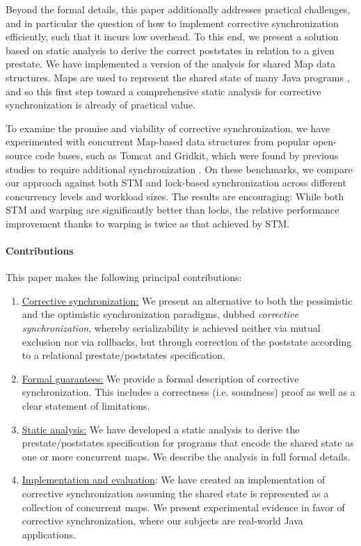 Beyond the formal details, this paper additionally addresses practical challenges, and in particular the question of how to implement corrective synchronization efficiently, such that it incurs low overhead. To this end, we present a solution based on static analysis to derive the correct poststates in relation to a given prestate. We have implemented a version of the analysis for shared {\sf Map} data structures. {\sf Map}s are used to represent the shared state of many Java programs \cite{OhadOOPSLA}, and so this first step toward a comprehensive static analysis for corrective synchronization is already of practical value.

To examine the promise and viability of corrective synchronization, we have experimented with concurrent {\sf Map}-based data structures from popular open-source code bases, such as Tomcat and Gridkit, which were found by previous studies to require additional synchronization \cite{oopsla/ShachamBASVY11,issta/ShachamYGABSV14}. On these benchmarks, we compare our approach against both STM and lock-based synchronization across different concurrency levels and workload sizes. The results are encouraging: While both STM and warping are significantly better than locks, the relative performance improvement thanks to warping is twice as that achieved by STM.


\paragraph{Contributions} This paper makes the following principal contributions:
\begin{enumerate}
	\item \underline{Corrective synchronization:} We present an alternative to both the pessimistic and the optimistic synchronization paradigms, dubbed \emph{corrective synchronization}, whereby serializability is achieved neither via mutual exclusion nor via rollbacks, but through correction of the poststate according to a relational prestate/poststates specification.
	\item \underline{Formal guarantees:} We provide a formal description of corrective synchronization. This includes a correctness (i.e. soundness) proof as well as a clear statement of limitations.
	\item \underline{Static analysis:} We have developed a static analysis to derive the prestate/poststates specification for programs that encode the shared state as one or more concurrent maps. We describe the analysis in full formal details.
	\item \underline{Implementation and evaluation}: We have created an implementation of corrective synchronization assuming the shared state is represented as a collection of concurrent maps. We present experimental evidence in favor of corrective synchronization, where our subjects are real-world Java applications.
\end{enumerate}